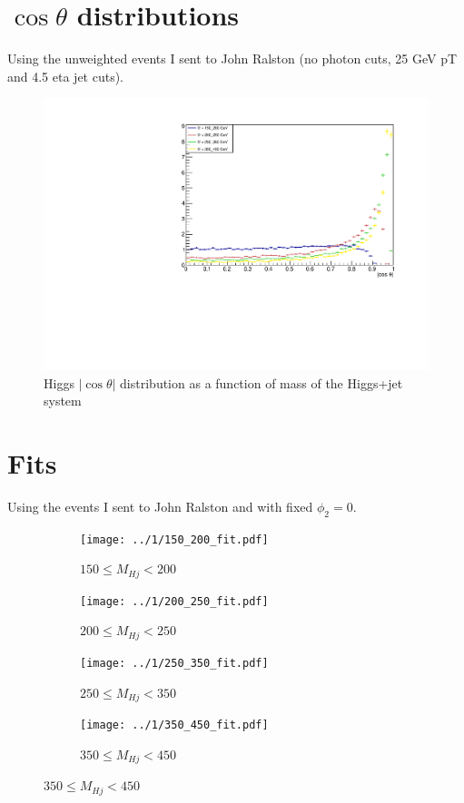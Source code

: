 \documentclass[12pt]{article}
\begin{document}
\section{\texorpdfstring{$\cos\theta$}{cos theta} distributions}
Using the unweighted events I sent to John Ralston
(no photon cuts, 25 GeV pT and 4.5 eta jet cuts).
\begin{figure}[H]
  \centering
  \includegraphics[width=0.75\linewidth]{plots/abs_cos_theta.pdf}
  \caption{Higgs $|\!\cos\theta|$ distribution as a function of mass of the Higgs+jet system}
\end{figure}

\pagebreak

\section{Fits}
Using the events I sent to John Ralston and with fixed $\phi_2 = 0$.

\begin{figure}[H]
  \centering
  \begin{subfigure}[b]{0.49\textwidth}
    \centering
    \caption{$150\leq M_{Hj}<200$}
    \texttt{[image: ../1/150\_200\_fit.pdf]}
  \end{subfigure}
  \begin{subfigure}[b]{0.49\textwidth}
    \centering
    \caption{$200\leq M_{Hj}<250$}
    \texttt{[image: ../1/200\_250\_fit.pdf]}
  \end{subfigure}
  \begin{subfigure}[b]{0.49\textwidth}
    \centering
    \caption{$250\leq M_{Hj}<350$}
    \texttt{[image: ../1/250\_350\_fit.pdf]}
  \end{subfigure}
  \begin{subfigure}[b]{0.49\textwidth}
    \centering
    \caption{$350\leq M_{Hj}<450$}
    \texttt{[image: ../1/350\_450\_fit.pdf]}
  \end{subfigure}
\end{figure}
\end{document}
